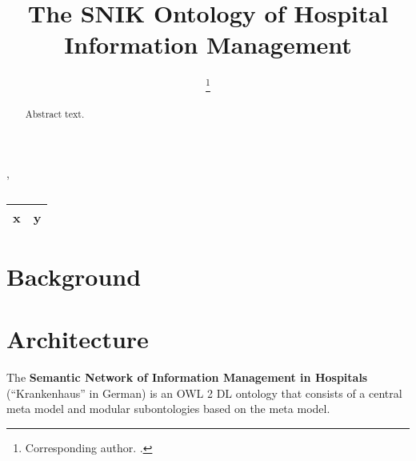 \documentclass[sw]{iosart2x}
\begin{document}
\begin{frontmatter}

\title{The SNIK Ontology of Hospital Information Management}

\author[A]{ %
\thanks{Corresponding author. .}},
\author[A]{ }
\author[A]{ }
\author[A]{ }
\author[A]{ }
\author[A]{ }
\runningauthor{}
\address[A]{Institute for Medical Informatics, Statistics and Epidemiology (IMISE),
, }

\begin{abstract}
Abstract text.
\end{abstract}

\begin{keyword}
\end{keyword}

\end{frontmatter}

\begin{table}
\caption{}
\label{tab:namespaces}
\begin{tabular}{ll}
\toprule
\textbf{x}	&\textbf{y}\\
\midrule
\bottomrule
\end{tabular}
\end{table}

\section{Background}

\section{Architecture}
The \textbf{Semantic Network of Information Management in Hospitals} (\enquote{Krankenhaus} in German) is an OWL 2 DL ontology that consists of a central meta model and modular subontologies based on the meta model.  
\end{document}
